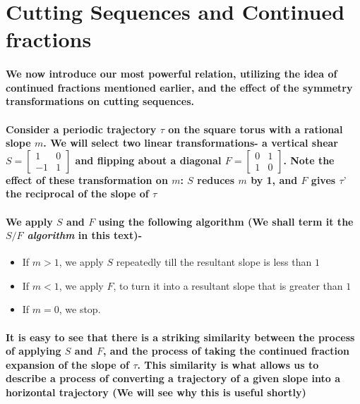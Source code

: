 \documentclass{report}
\begin{document}
\section{Cutting Sequences and Continued fractions}

\paragraph{We now introduce our most powerful relation, utilizing the idea of continued fractions mentioned earlier, and the effect of the symmetry transformations on cutting sequences.}

\paragraph{Consider a periodic trajectory $\tau$ on the square torus with a rational slope $m$. We will select two linear transformations- 
a vertical shear
$S=\begin{bmatrix}
1&0\\-1&1
\end{bmatrix}$
and flipping about a diagonal 
$F=\begin{bmatrix}
0&1\\1&0
\end{bmatrix}$.
Note the effect of these transformation on $m$: $S$ reduces $m$ by 1, and $F$ gives $\tau’$ the reciprocal of the slope of $\tau$}

\paragraph{We apply $S$ and $F$ using the following algorithm (We shall term it the \textit{$S/F$ algorithm} in this text)-}

\begin{itemize}
\item  {If $m>1$, we apply $S$ repeatedly till the resultant slope is less than $1$}

\item  {If $m<1$, we apply $F$, to turn it into a resultant slope that is greater than $1$}

\item  {If $m=0$, we stop.}
\end{itemize}

\paragraph{It is easy to see that there is a striking similarity between the process of applying $S$ and $F$, and the process of taking the continued fraction expansion of the slope of $\tau$. This similarity is what allows us to describe a process of converting a trajectory of a given slope into a horizontal trajectory (We will see why this is useful shortly)}
\end{document}
